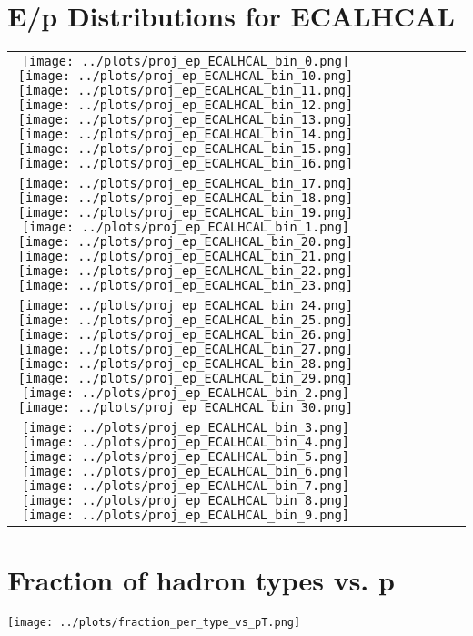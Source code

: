 \documentclass[a4paper,10pt]{article}
\begin{document}
\section*{E/p Distributions for ECALHCAL}
\begin{center}
\setlength{\tabcolsep}{2pt}
\renewcommand{\arraystretch}{1.0}
\begin{tabular}{cccccccc}
    \texttt{[image: ../plots/proj\_ep\_ECALHCAL\_bin\_0.png]} %
    \texttt{[image: ../plots/proj\_ep\_ECALHCAL\_bin\_10.png]} %
    \texttt{[image: ../plots/proj\_ep\_ECALHCAL\_bin\_11.png]} %
    \texttt{[image: ../plots/proj\_ep\_ECALHCAL\_bin\_12.png]} %
    \texttt{[image: ../plots/proj\_ep\_ECALHCAL\_bin\_13.png]} %
    \texttt{[image: ../plots/proj\_ep\_ECALHCAL\_bin\_14.png]} %
    \texttt{[image: ../plots/proj\_ep\_ECALHCAL\_bin\_15.png]} %
    \texttt{[image: ../plots/proj\_ep\_ECALHCAL\_bin\_16.png]} \\
    \texttt{[image: ../plots/proj\_ep\_ECALHCAL\_bin\_17.png]} %
    \texttt{[image: ../plots/proj\_ep\_ECALHCAL\_bin\_18.png]} %
    \texttt{[image: ../plots/proj\_ep\_ECALHCAL\_bin\_19.png]} %
    \texttt{[image: ../plots/proj\_ep\_ECALHCAL\_bin\_1.png]} %
    \texttt{[image: ../plots/proj\_ep\_ECALHCAL\_bin\_20.png]} %
    \texttt{[image: ../plots/proj\_ep\_ECALHCAL\_bin\_21.png]} %
    \texttt{[image: ../plots/proj\_ep\_ECALHCAL\_bin\_22.png]} %
    \texttt{[image: ../plots/proj\_ep\_ECALHCAL\_bin\_23.png]} \\
    \texttt{[image: ../plots/proj\_ep\_ECALHCAL\_bin\_24.png]} %
    \texttt{[image: ../plots/proj\_ep\_ECALHCAL\_bin\_25.png]} %
    \texttt{[image: ../plots/proj\_ep\_ECALHCAL\_bin\_26.png]} %
    \texttt{[image: ../plots/proj\_ep\_ECALHCAL\_bin\_27.png]} %
    \texttt{[image: ../plots/proj\_ep\_ECALHCAL\_bin\_28.png]} %
    \texttt{[image: ../plots/proj\_ep\_ECALHCAL\_bin\_29.png]} %
    \texttt{[image: ../plots/proj\_ep\_ECALHCAL\_bin\_2.png]} %
    \texttt{[image: ../plots/proj\_ep\_ECALHCAL\_bin\_30.png]} \\
    \texttt{[image: ../plots/proj\_ep\_ECALHCAL\_bin\_3.png]} %
    \texttt{[image: ../plots/proj\_ep\_ECALHCAL\_bin\_4.png]} %
    \texttt{[image: ../plots/proj\_ep\_ECALHCAL\_bin\_5.png]} %
    \texttt{[image: ../plots/proj\_ep\_ECALHCAL\_bin\_6.png]} %
    \texttt{[image: ../plots/proj\_ep\_ECALHCAL\_bin\_7.png]} %
    \texttt{[image: ../plots/proj\_ep\_ECALHCAL\_bin\_8.png]} %
    \texttt{[image: ../plots/proj\_ep\_ECALHCAL\_bin\_9.png]} %
\end{tabular}
\end{center}

\section*{Fraction of hadron types vs. p}
\begin{center}
\texttt{[image: ../plots/fraction\_per\_type\_vs\_pT.png]}
\end{center}
\newpage
\end{document}
